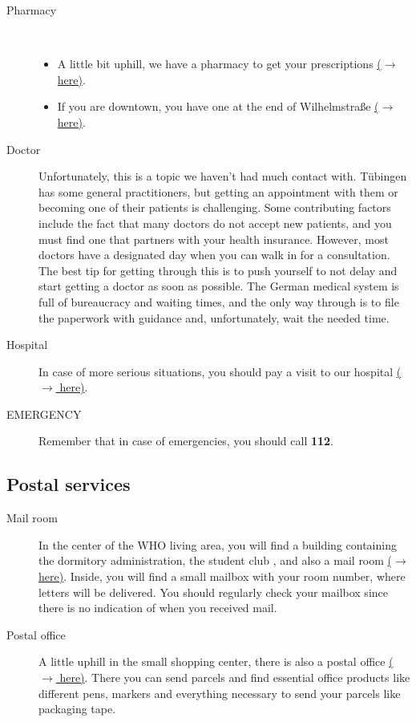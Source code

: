 \begin{description}
      \item[Pharmacy] \ \
            \begin{itemize}
                  \item A little bit uphill, we have a pharmacy to get your prescriptions \href{https://maps.app.goo.gl/cpDLc9VZ7XukpgS18}{($\xrightarrow{}$ here)}.
                  \item If you are downtown, you have one at the end of Wilhelmstraße \href{https://maps.app.goo.gl/YXwvVpp81eTSZeJW7}{($\xrightarrow{}$ here)}.
            \end{itemize}

      \item[Doctor]
            Unfortunately, this is a topic we haven’t had much contact with. Tübingen has some general practitioners, but getting an appointment with them or becoming one of their patients is challenging. Some contributing factors include the fact that many doctors do not accept new patients, and you must find one that partners with your health insurance. However, most doctors have a designated day when you can walk in for a consultation. The best tip for getting through this is to push yourself to not delay and start getting a doctor as soon as possible. The German medical system is full of bureaucracy and waiting times, and the only way through is to file the paperwork with guidance and, unfortunately, wait the needed time.

      \item[Hospital]
            In case of more serious situations, you should pay a visit to our hospital \href{https://maps.app.goo.gl/EHyduztd2QgxTVer9}{($\xrightarrow{}$ here)}.

      \item[EMERGENCY]
            Remember that in case of emergencies, you should call \textbf{112}.
\end{description}

\subsection{Postal services}
\begin{description}
      \item[Mail room]
            In the center of the WHO living area, you will find a building containing the dormitory administration, the student club , and also a mail room \href{https://maps.app.goo.gl/W9UtqfhE1LJJ5oGH8}{($\xrightarrow{}$ here)}. Inside, you will find a small mailbox with your room number, where letters will be delivered. You should regularly check your mailbox since there is no indication of when you received mail.
      \item[Postal office]
            A little uphill in the small  shopping center, there is also a postal office \href{https://maps.app.goo.gl/nMnEheHexNQ5NZY37}{($\xrightarrow{}$ here)}. There you can send parcels and find essential office products like different pens, markers and everything necessary to send your parcels like packaging tape.
\end{description}

